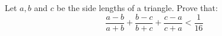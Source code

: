 Let $a,b$ and $c$ be the side lengths of a triangle. Prove that:\[\frac{a-b}{a+b}+\frac{b-c}{b+c}+\frac{c-a}{c+a}<\frac{1}{16}\]